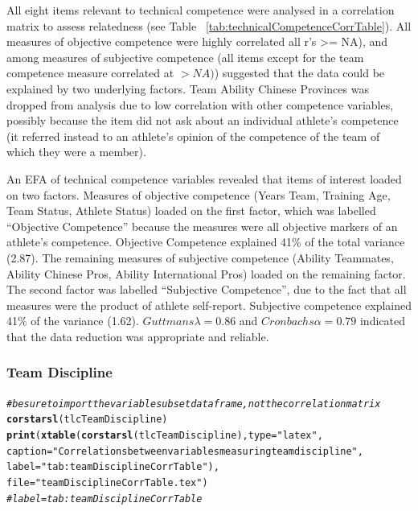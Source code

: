 \documentclass[english]{article}\usepackage[]{graphicx}\usepackage[]{color}
\makeatletter
\newcommand{\hlstr}[1]{\textcolor[rgb]{0.192,0.494,0.8}{#1}}%
\newcommand{\hlcom}[1]{\textcolor[rgb]{0.678,0.584,0.686}{\textit{#1}}}%
\newcommand{\hlstd}[1]{\textcolor[rgb]{0.345,0.345,0.345}{#1}}%
\newcommand{\hlkwc}[1]{\textcolor[rgb]{0.333,0.667,0.333}{#1}}%
\newcommand{\hlkwd}[1]{\textcolor[rgb]{0.737,0.353,0.396}{\textbf{#1}}}%
\newenvironment{kframe}{%
 \def\at@end@of@kframe{}%
 \ifinner\ifhmode%
  \def\at@end@of@kframe{\end{minipage}}%
  \begin{minipage}{\columnwidth}%
 \fi\fi%
 \def\FrameCommand##1{\hskip\@totalleftmargin \hskip-\fboxsep
 \colorbox{shadecolor}{##1}\hskip-\fboxsep
     \hskip-\linewidth \hskip-\@totalleftmargin \hskip\columnwidth}%
 \MakeFramed {\advance\hsize-\width
   \@totalleftmargin\z@ \linewidth\hsize
   \@setminipage}}%
 {\par\unskip\endMakeFramed%
 \at@end@of@kframe}
\newenvironment{knitrout}{}{} %
\makeatother
\begin{document}
All eight items relevant to technical competence were analysed in a correlation matrix to assess relatedness (see Table ~\ref{tab:technicalCompetenceCorrTable}). All measures of objective competence were highly correlated all r's >= NA),  and among measures of subjective competence (all items except for the team competence measure correlated at $> NA)$) suggested that the data could be explained by two underlying factors. Team Ability Chinese Provinces was dropped from analysis due to low correlation with other competence variables, possibly because the item did not ask about an individual athlete’s competence (it referred instead to an athlete’s opinion of the competence of the team of which they were a member).

An EFA of technical competence variables revealed that items of interest loaded on two factors. Measures of objective competence (Years Team, Training Age, Team Status, Athlete Status) loaded on the first factor, which was labelled ``Objective Competence'' because the measures were all objective markers of an athlete's competence.
Objective Competence explained 41\% of the total variance (2.87). The remaining measures of subjective competence (Ability Teammates, Ability Chinese Pros, Ability International Pros) loaded on the remaining factor.  The second factor was labelled ``Subjective Competence'', due to the fact that all measures were the product of athlete self-report.  Subjective competence explained 41\% of the variance (1.62).
$Guttmans \lambda = 0.86$ and $Cronbachs \alpha = 0.79$ indicated that the data reduction was appropriate and reliable.








\subsubsection{Team Discipline}





\begin{knitrout}
\color{fgcolor}\begin{kframe}
\begin{alltt}
\hlcom{# be sure to import the variable subset data frame, not the correlation matrix}
\hlkwd{corstarsl}\hlstd{(tlcTeamDiscipline)}
\hlkwd{print}\hlstd{(}\hlkwd{xtable}\hlstd{(}\hlkwd{corstarsl}\hlstd{(tlcTeamDiscipline),} \hlkwc{type}\hlstd{=}\hlstr{"latex"}\hlstd{,}
                    \hlkwc{caption} \hlstd{=} \hlstr{"Correlations between variables measuring team discipline"}\hlstd{,}
                    \hlkwc{label} \hlstd{=} \hlstr{"tab:teamDisciplineCorrTable"}\hlstd{),}
                    \hlkwc{file} \hlstd{=} \hlstr{"teamDisciplineCorrTable.tex"}\hlstd{)}
\hlcom{# label = tab:teamDisciplineCorrTable}
\end{alltt}
\end{kframe}
\end{knitrout}
\end{document}

